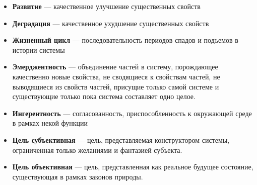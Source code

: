 \documentclass{article}
\newcommand{\define}[2]{
	\textbf{#1} --- #2
	}
\begin{document}
{\begin{itemize}
		\item \define{Развитие}{качественное улучшение существенных свойств}
		\item \define{Деградация}{качественное ухудшение существенных свойств}	
		\item \define{Жизненный цикл}{последовательность периодов спадов и подъемов в истории системы}
		\item \define{Эмерджентность}{объединение частей в систему, порождающее качественно новые свойства, не сводящиеся к свойствам частей, не выводящиеся из свойств частей, присущие только самой системе и существующие только пока система составляет одно целое.}
		\item \define{Ингерентность}{согласованность, приспособленность к окружающей среде в рамках некой функции}
		\item \define{Цель субъективная}{цель, представляемая конструктором системы, ограниченная только желаниями и фантазией субъекта.}
		\item \define{Цель объективная}{цель, представленная как реальное будущее состояние, существующая в рамках законов природы.}
	\end{itemize}}
\end{document}
